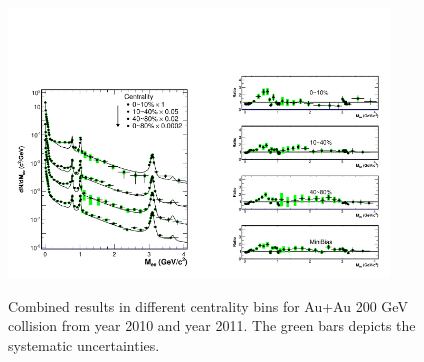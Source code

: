 \begin{figure}
\begin{centering}
\includegraphics[width=0.45\textwidth]{fig/3.Analysis/Run11/Cen_Yield_cocktail_Combined}\includegraphics[width=0.45\textwidth]{fig/3.Analysis/Run11/Cen_ratio_Combined}
\par\end{centering}

\protect\caption{Combined results in different centrality bins for Au+Au 200 GeV collision
from year 2010 and year 2011. The green bars depicts the systematic
uncertainties.}


\label{fig:comb cen}
\end{figure}


